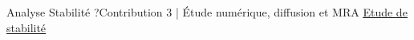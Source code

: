 \begin{frame}{Analyse Stabilité ?}{Contribution 3 | Étude numérique, diffusion et MRA}
    \centering \Large
    \href{https://github.com/Ocelot-Pale/etude_MR_RK2}{\color{Primary} \underline{Etude de stabilité}}\color{black}
\end{frame}